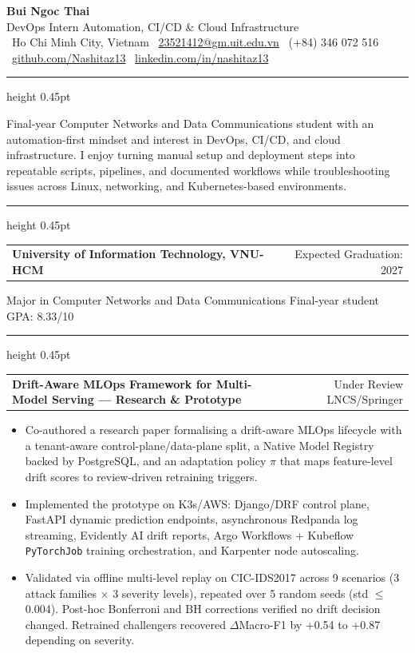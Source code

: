 \documentclass[10pt,a4paper]{article}
\makeatletter
\newcommand{\sectionTitle}[1]{%
  \vspace{8pt}
  \par\noindent{\normalsize\bfseries\textcolor{accent}{\MakeUppercase{#1}}}\par
  \vspace{3pt}
  \hrule height 0.45pt
  \vspace{4.5pt}
}
\newcommand{\resumeProject}[3]{%
  \vspace{3.5pt}
  \begin{tabularx}{\textwidth}{@{}>{\raggedright\arraybackslash}X@{\hspace{1.2em}}r@{}}
    \textbf{#1} & #2 \\
  \end{tabularx}
  \vspace{-0.55em}
  #3
}
\makeatother
\begin{document}
\raggedright

\begin{center}
  {\LARGE \textbf{\textcolor{accent}{Bui Ngoc Thai}}}\\
  \vspace{0.18em}
  DevOps Intern \textbar{} Automation, CI/CD \& Cloud Infrastructure\\
  \vspace{0.25em}
  {\footnotesize
  \faMapMarker*~Ho Chi Minh City, Vietnam \textbar{}
  \faEnvelope~\href{mailto:23521412@gm.uit.edu.vn}{23521412@gm.uit.edu.vn} \textbar{}
  \faPhone*~(+84) 346 072 516 \textbar{}
  \faGithub~\href{https://github.com/Nashitaz13}{github.com/Nashitaz13} \textbar{}
  \faLinkedin~\href{https://www.linkedin.com/in/nashitaz13/}{linkedin.com/in/nashitaz13}}
\end{center}

\vspace{-0.55em}

\sectionTitle{Summary}
Final-year Computer Networks and Data Communications student with an automation-first mindset and interest in DevOps, CI/CD, and cloud infrastructure. I enjoy turning manual setup and deployment steps into repeatable scripts, pipelines, and documented workflows while troubleshooting issues across Linux, networking, and Kubernetes-based environments.

\sectionTitle{Education}
\begin{tabularx}{\textwidth}{@{}>{\raggedright\arraybackslash}Xr@{}}
  \textbf{University of Information Technology, VNU-HCM} & Expected Graduation: 2027 \\
\end{tabularx}
Major in Computer Networks and Data Communications \textbar{} Final-year student \textbar{} GPA: 8.33/10

\sectionTitle{Projects}
\resumeProject{Drift-Aware MLOps Framework for Multi-Model Serving --- Research \& Prototype}{%
  \footnotesize Under Review \textbar{} LNCS/Springer}{%
\begin{itemize}
  \item Co-authored a research paper formalising a drift-aware MLOps lifecycle with a tenant-aware
        control-plane/data-plane split, a Native Model Registry backed by PostgreSQL, and an adaptation
        policy $\pi$ that maps feature-level drift scores to review-driven retraining triggers.
  \item Implemented the prototype on K3s/AWS: Django/DRF control plane, FastAPI dynamic prediction
        endpoints, asynchronous Redpanda log streaming, Evidently AI drift reports, Argo Workflows
        + Kubeflow \texttt{PyTorchJob} training orchestration, and Karpenter node autoscaling.
  \item Validated via offline multi-level replay on CIC-IDS2017 across 9 scenarios (3 attack
        families $\times$ 3 severity levels), repeated over 5 random seeds (std $\leq$ 0.004).
        Post-hoc Bonferroni and BH corrections verified no drift decision changed.
        Retrained challengers recovered $\Delta$Macro-F1 by +0.54 to +0.87 depending on severity.
\end{itemize}
}
\end{document}
